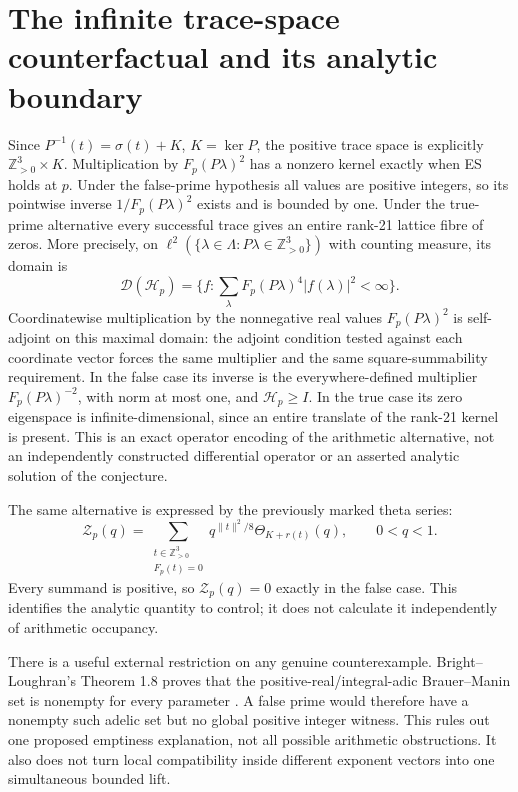 \documentclass[11pt]{article}
\theoremstyle{definition}\newtheorem{definition}[theorem]{Definition}
\theoremstyle{remark}\newtheorem{remark}[theorem]{Remark}
\newcommand{\Z}{\mathbb Z}\newcommand{\Q}{\mathbb Q}\newcommand{\R}{\mathbb R}
\begin{document}
\section{The infinite trace-space counterfactual and its analytic boundary}
Since $P^{-1}(t)=\sigma(t)+K$, $K=\ker P$, the positive trace space is
explicitly $\Z_{>0}^3\times K$. Multiplication by
$F_p(P\lambda)^2$ has a nonzero kernel exactly when ES holds at $p$.
Under the false-prime hypothesis all values are positive integers, so its
pointwise inverse $1/F_p(P\lambda)^2$ exists and is bounded by one.
Under the true-prime alternative every successful trace gives an entire
rank-21 lattice fibre of zeros. More precisely, on
$\ell^2(\{\lambda\in\Lambda:P\lambda\in\Z_{>0}^3\})$ with counting measure,
its domain is
\[
 \mathcal D(\mathcal H_p)=\{f:\sum_\lambda
    F_p(P\lambda)^4|f(\lambda)|^2<\infty\}.
\]
Coordinatewise multiplication by the nonnegative real values
$F_p(P\lambda)^2$ is self-adjoint on this maximal domain: the adjoint
condition tested against each coordinate vector forces the same multiplier
and the same square-summability requirement. In the false case its inverse
is the everywhere-defined multiplier $F_p(P\lambda)^{-2}$, with norm at
most one, and $\mathcal H_p\ge I$. In the true case its zero eigenspace is
infinite-dimensional, since an entire translate of the rank-21 kernel is
present. This is an exact operator encoding of the arithmetic alternative,
not an independently constructed differential operator or an asserted
analytic solution of the conjecture.

The same alternative is expressed by the previously marked theta series:
\[
 \mathcal Z_p(q)=
 \sum_{\substack{t\in\Z_{>0}^3\\F_p(t)=0}}
 q^{\|t\|^2/8}\Theta_{K+r(t)}(q),\qquad 0<q<1.
\]
Every summand is positive, so $\mathcal Z_p(q)=0$ exactly in the false
case. This identifies the analytic quantity to control; it does not
calculate it independently of arithmetic occupancy.

There is a useful external restriction on any genuine counterexample.
Bright--Loughran's Theorem 1.8 proves that the positive-real/integral-adic
Brauer--Manin set is nonempty for every parameter \cite{bl}. A false
prime would therefore have a nonempty such adelic set but no global positive
integer witness. This rules out one proposed emptiness explanation, not all
possible arithmetic obstructions. It also does not turn local compatibility
inside different exponent vectors into one simultaneous bounded lift.
\end{document}
